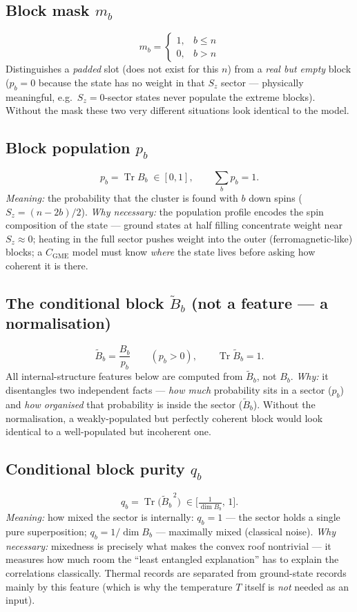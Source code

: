 \documentclass[11pt]{article}
\newcommand{\CGME}{\ensuremath{C_{\mathrm{GME}}}}
\newcommand{\Bb}{\ensuremath{B_b}}
\newcommand{\Bt}{\ensuremath{\widetilde B_b}}
\begin{document}
\subsection{Block mask $m_b$}
\[
  m_b=\begin{cases}1,& b\le n\\ 0,& b>n\end{cases}
\]
Distinguishes a \emph{padded} slot (does not exist for this $n$) from a
\emph{real but empty} block ($p_b=0$ because the state has no weight in that
$S_z$ sector --- physically meaningful, e.g.\ $S_z{=}0$-sector states never
populate the extreme blocks). Without the mask these two very different
situations look identical to the model.

\subsection{Block population $p_b$}
\[
  p_b=\operatorname{Tr}\Bb\;\in[0,1],\qquad \sum_b p_b=1 .
\]
\emph{Meaning:} the probability that the cluster is found with $b$ down
spins ($S_z=(n-2b)/2$). \emph{Why necessary:} the population profile encodes
the spin composition of the state --- ground states at half filling
concentrate weight near $S_z\!\approx\!0$; heating in the full sector pushes
weight into the outer (ferromagnetic-like) blocks; a $\CGME$ model must know
\emph{where} the state lives before asking how coherent it is there.

\subsection{The conditional block $\Bt$ (not a feature --- a normalisation)}
\[
  \Bt=\frac{\Bb}{p_b}\qquad (p_b>0),\qquad \operatorname{Tr}\Bt=1 .
\]
All internal-structure features below are computed from $\Bt$, not $\Bb$.
\emph{Why:} it disentangles two independent facts --- \emph{how much}
probability sits in a sector ($p_b$) and \emph{how organised} that
probability is inside the sector ($\Bt$). Without the normalisation, a
weakly-populated but perfectly coherent block would look identical to a
well-populated but incoherent one.

\subsection{Conditional block purity $q_b$}
\[
  q_b=\operatorname{Tr}\!\big(\Bt^{\,2}\big)\;\in\Big[\tfrac{1}{\dim\Bb},\,1\Big].
\]
\emph{Meaning:} how mixed the sector is internally: $q_b=1$ --- the sector
holds a single pure superposition; $q_b=1/\dim\Bb$ --- maximally mixed
(classical noise). \emph{Why necessary:} mixedness is precisely what makes
the convex roof nontrivial --- it measures how much room the ``least
entangled explanation'' has to explain the correlations classically.
Thermal records are separated from ground-state records mainly by this
feature (which is why the temperature $T$ itself is \emph{not} needed as an
input).
\end{document}
